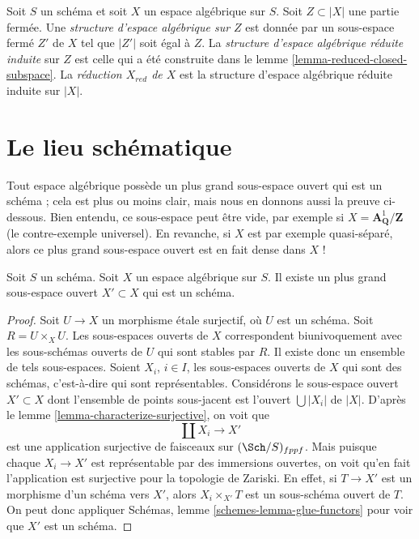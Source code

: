 \begin{definition}
\label{definition-reduced-induced-space}
Soit $S$ un schéma et soit $X$ un espace algébrique sur $S$.
Soit $Z \subset |X|$ une partie fermée.
Une {\it structure d'espace algébrique sur $Z$} est donnée par un sous-espace fermé
$Z'$ de $X$ tel que $|Z'|$ soit égal à $Z$.
La {\it structure d'espace algébrique réduite induite}
sur $Z$ est celle qui a été construite dans le
lemme \ref{lemma-reduced-closed-subspace}.
La {\it réduction $X_{red}$ de $X$} est la structure d'espace
algébrique réduite induite sur $|X|$.
\end{definition}











\section{Le lieu schématique}
\label{section-schematic}

\noindent
Tout espace algébrique possède un plus grand sous-espace ouvert qui est un
schéma ; cela est plus ou moins clair, mais nous en donnons aussi la preuve ci-dessous.
Bien entendu, ce sous-espace peut être vide, par exemple si
$X = \mathbf{A}^1_{\mathbf{Q}}/\mathbf{Z}$ (le
contre-exemple universel). En revanche, si $X$ est par exemple quasi-séparé,
alors ce plus grand sous-espace ouvert est en fait dense dans $X$ !

\begin{lemma}
\label{lemma-subscheme}
Soit $S$ un schéma.
Soit $X$ un espace algébrique sur $S$.
Il existe un plus grand sous-espace ouvert $X' \subset X$ qui est un schéma.
\end{lemma}

\begin{proof}
Soit $U \to X$ un morphisme \'etale surjectif, où $U$ est un schéma.
Soit $R = U \times_X U$. Les sous-espaces ouverts de $X$ correspondent biunivoquement
avec les sous-schémas ouverts de $U$ qui sont stables par $R$. Il existe donc un
ensemble de tels sous-espaces. Soient $X_i$, $i \in I$, les sous-espaces ouverts
de $X$ qui sont des schémas, c'est-à-dire qui sont représentables. Considérons le
sous-espace ouvert $X' \subset X$ dont l'ensemble de points sous-jacent est
l'ouvert $\bigcup |X_i|$ de $|X|$. D'après le
lemme \ref{lemma-characterize-surjective},
on voit que
$$
\coprod X_i \longrightarrow X'
$$
est une application surjective de faisceaux sur $(\Sch/S)_{fppf}$.
Mais puisque chaque $X_i \to X'$ est représentable par des immersions ouvertes,
on voit qu'en fait l'application est surjective pour la topologie de Zariski.
En effet, si $T \to X'$ est un morphisme d'un schéma
vers $X'$, alors $X_i \times_{X'} T$ est un sous-schéma ouvert de $T$.
On peut donc appliquer
Schémas, lemme \ref{schemes-lemma-glue-functors}
pour voir que $X'$ est un schéma.
\end{proof}

